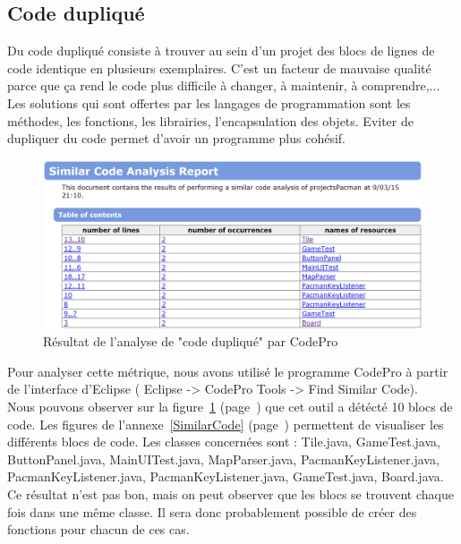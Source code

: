 \documentclass[12pt,a4paper,final]{article}
\newcommand{\annexe}[1]{annexe~\ref{#1} (page~\pageref{#1})}
\newcommand{\labelfigure}[1]{figure~\ref{#1} (page~\pageref{#1})}
\begin{document}
\subsection{Code dupliqué}\label{codeduplique}
Du code dupliqué consiste à trouver au sein d'un projet des blocs de lignes de code identique en plusieurs exemplaires.
C'est un facteur de mauvaise qualité parce que ça rend le code plus difficile à changer, à maintenir, à comprendre,...\\
Les solutions qui sont offertes par les langages de programmation sont les méthodes, les fonctions, les librairies, l'encapsulation des objets. Eviter de dupliquer du code permet d'avoir un programme plus cohésif.\\
\begin{figure}[!h]
	\centering
	\includegraphics[width=\textwidth]{SimilarCode_00.png}
	\caption{\label{SimilarCode0}Résultat de l'analyse de "code dupliqué" par CodePro}
\end{figure}
Pour analyser cette métrique, nous avons utilisé le programme CodePro à partir de l'interface d'Eclipse ( Eclipse -> CodePro Tools -> Find Similar Code).\\
Nous pouvons observer sur la \labelfigure{SimilarCode0} que cet outil a détécté 10 blocs de code. Les figures de l'\annexe{SimilarCode} permettent de visualiser les différents blocs de code.
Les classes concernées sont : Tile.java, GameTest.java, ButtonPanel.java, MainUITest.java, MapParser.java, PacmanKeyListener.java, PacmanKeyListener.java, PacmanKeyListener.java,  GameTest.java, Board.java.\\
Ce résultat n'est pas bon, mais on peut observer que les blocs se trouvent chaque fois dans une même classe. Il sera donc probablement possible de créer des fonctions pour chacun de ces cas.

\end{document}
